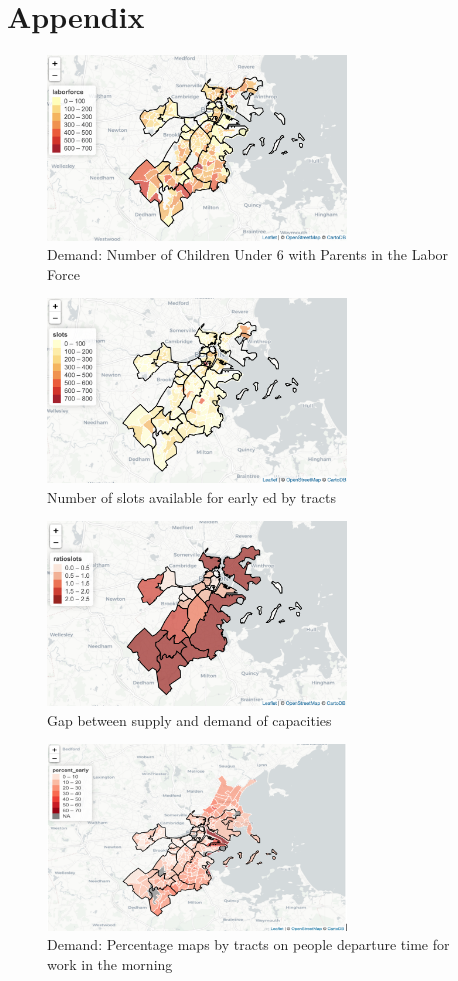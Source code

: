 \documentclass[10pt,letterpaper]{article}
\begin{document}
\section{Appendix}\label{appendix}

\begin{figure}
\centering
\includegraphics[width=3.12500in]{fig1.png}
\caption{Demand: Number of Children Under 6 with Parents in the Labor
Force}
\end{figure}

\begin{figure}
\centering
\includegraphics[width=3.12500in]{Fig 2, slots.png}
\caption{Number of slots available for early ed by tracts}
\end{figure}

\begin{figure}
\centering
\includegraphics[width=3.12500in]{Fig 3, ratioslots.png}
\caption{Gap between supply and demand of capacities}
\end{figure}

\begin{figure}
\centering
\includegraphics[width=3.12500in]{fig4.png}
\caption{Demand: Percentage maps by tracts on people departure time for
work in the morning}
\end{figure}
\end{document}
